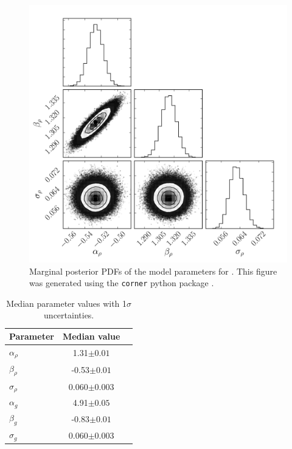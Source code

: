 \begin{figure}
\begin{center}
\includegraphics[width=6in,angle=0,clip=true]{figures/rho_triangle.pdf}
\caption[Marginal posterior PDFs for flicker versus \rhostar\ parameters.]
{Marginal posterior PDFs of the model parameters for \rhostar.
This figure was generated using the {\tt corner} python package
\citep{Corner}.}
\label{fig:triangle}
\end{center}
\end{figure}

\begin{table}
\begin{center}
\caption[Flicker results.]
{Median parameter values with 1$\sigma$ uncertainties.}
\begin{tabular}{lcc}
\hline\hline
Parameter & Median value \\
    \hline
$\alpha_\rho$   &    1.31$\pm 0.01$   \\
$\beta_\rho$    &    -0.53$\pm 0.01$   \\
$\sigma_\rho$   &    0.060$\pm 0.003$   \\
\hline
$\alpha_g$      &    4.91$\pm 0.05$   \\
$\beta_g$       &   -0.83$\pm 0.01$   \\
$\sigma_g$      &    0.060$\pm 0.003$   \\
    \hline
\end{tabular}
\end{center}
\end{table}
\label{tab:results}

